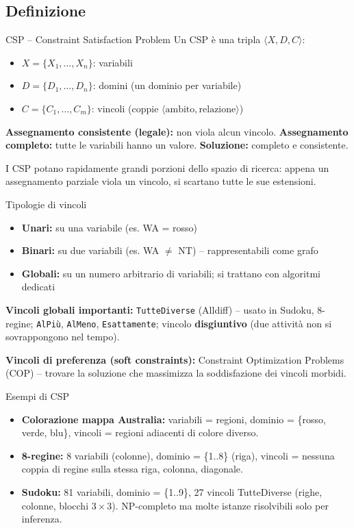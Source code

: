 \documentclass[12pt,a4paper]{article}
\begin{document}
\subsection{Definizione}

\begin{defbox}{CSP -- Constraint Satisfaction Problem}
Un CSP è una tripla $\langle X, D, C \rangle$:
\begin{itemize}[noitemsep]
  \item $X = \{X_1, \ldots, X_n\}$: variabili
  \item $D = \{D_1, \ldots, D_n\}$: domini (un dominio per variabile)
  \item $C = \{C_1, \ldots, C_m\}$: vincoli (coppie $\langle \text{ambito}, \text{relazione} \rangle$)
\end{itemize}
\textbf{Assegnamento consistente (legale):} non viola alcun vincolo. \textbf{Assegnamento completo:} tutte le variabili hanno un valore. \textbf{Soluzione:} completo e consistente.

I CSP potano rapidamente grandi porzioni dello spazio di ricerca: appena un assegnamento parziale viola un vincolo, si scartano tutte le sue estensioni.
\end{defbox}

\begin{defbox}{Tipologie di vincoli}
\begin{itemize}[noitemsep]
  \item \textbf{Unari:} su una variabile (es. WA = rosso)
  \item \textbf{Binari:} su due variabili (es. WA $\neq$ NT) -- rappresentabili come grafo
  \item \textbf{Globali:} su un numero arbitrario di variabili; si trattano con algoritmi dedicati
\end{itemize}
\textbf{Vincoli globali importanti:} \texttt{TutteDiverse} (Alldiff) -- usato in Sudoku, 8-regine; \texttt{AlPiù}, \texttt{AlMeno}, \texttt{Esattamente}; vincolo \textbf{disgiuntivo} (due attività non si sovrappongono nel tempo).

\textbf{Vincoli di preferenza (soft constraints):} Constraint Optimization Problems (COP) -- trovare la soluzione che massimizza la soddisfazione dei vincoli morbidi.
\end{defbox}

\begin{esempiobox}{Esempi di CSP}
\begin{itemize}[noitemsep]
  \item \textbf{Colorazione mappa Australia:} variabili = regioni, dominio = \{rosso, verde, blu\}, vincoli = regioni adiacenti di colore diverso.
  \item \textbf{8-regine:} 8 variabili (colonne), dominio = \{1..8\} (riga), vincoli = nessuna coppia di regine sulla stessa riga, colonna, diagonale.
  \item \textbf{Sudoku:} 81 variabili, dominio = \{1..9\}, 27 vincoli TutteDiverse (righe, colonne, blocchi $3\times3$). NP-completo ma molte istanze risolvibili solo per inferenza.
\end{itemize}
\end{esempiobox}
\end{document}
